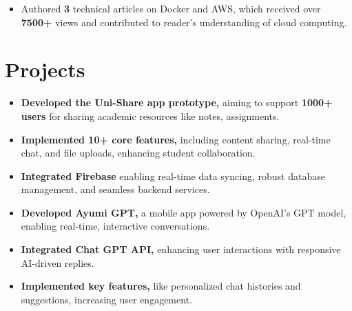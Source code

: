 \documentclass[]{deedy-resume-openfont}
\begin{document}
\begin{minipage}[t]{0.66\textwidth}
\vspace{\topsep}
\begin{itemize}[leftmargin=*]
    \item Authored \textbf{3} technical articles on Docker and AWS, which received over \textbf{7500+} views and contributed to reader's understanding of cloud computing.
\end{itemize}

\sectionsep

\section{Projects}
\begin{itemize}[leftmargin=*]
    \item \textbf{Developed the Uni-Share app prototype,} aiming to support \textbf {1000+ users} for sharing academic resources like notes, assignments.
    \vspace{-2.3mm} %
    \item \textbf{Implemented 10+ core features,} including content sharing, real-time chat, and file uploads, enhancing student collaboration.
    \vspace{-2.3mm}
    \item \textbf{Integrated Firebase} enabling real-time data syncing, robust database management, and seamless backend services.
\end{itemize}
\sectionsep

\begin{itemize}[leftmargin=*]
    \item \textbf{Developed Ayumi GPT,} a mobile app powered by OpenAI’s GPT model, enabling real-time, interactive conversations.
    \vspace{-2.4mm} %
    \item \textbf{Integrated Chat GPT API,} enhancing user interactions with responsive AI-driven replies.
    \vspace{-2.4mm}
    \item \textbf{Implemented key features,} like personalized chat histories and suggestions, increasing user engagement.
\end{itemize}
\sectionsep

\end{minipage} 
\end{document}
